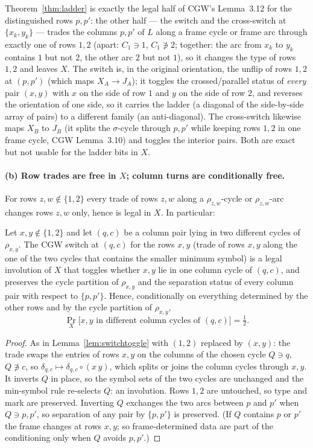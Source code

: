 Theorem~\ref{thm:ladder} is exactly the legal half of CGW's
Lemma~3.12 for the distinguished rows $p,p'$: the other half --- the
switch and the cross-switch at $\{x_k,y_k\}$ --- trades the columns
$p,p'$ of $L$ along a frame cycle or frame arc through exactly one of
rows $1,2$ (apart: $C_1\ni1$, $C_1\not\ni2$; together: the arc from
$x_k$ to $y_k$ contains $1$ but not $2$, the other arc $2$ but not
$1$), so it changes the type of rows $1,2$ and leaves $X$.  The switch
is, in the original orientation, the unflip of rows $1,2$ at $(p,p')$
(which maps $X_A\to J_A$); it toggles the crossed/parallel status of
\emph{every} pair $(x,y)$ with $x$ on the side of row $1$ and $y$ on
the side of row $2$, and reverses the orientation of one side, so it
carries the ladder (a diagonal of the side-by-side array of pairs) to
a different family (an anti-diagonal).  The cross-switch likewise maps
$X_B$ to $J_B$ (it splits the $\sigma$-cycle through $p,p'$ while
keeping rows $1,2$ in one frame cycle, CGW Lemma~3.10) and toggles
the interior pairs.  Both are exact but not usable for the ladder bits
in $X$.

\paragraph{(b) Row trades are free in $X$; column turns are
conditionally free.}  For rows $z,w\notin\{1,2\}$ every trade of rows
$z,w$ along a $\rho_{z,w}$-cycle or $\rho_{z,w}$-arc changes rows
$z,w$ only, hence is legal in $X$.  In particular:

\begin{lemma}
\label{lem:rowfair}
Let $x,y\notin\{1,2\}$ and let $(q,c)$ be a column pair lying in two
different cycles of $\rho_{x,y}$.  The CGW switch at $(q,c)$ for the
rows $x,y$ (trade of rows $x,y$ along the one of the two cycles that
contains the smaller minimum symbol) is a legal involution of $X$
that toggles whether $x,y$ lie in one column cycle of $(q,c)$, and
preserves the cycle partition of $\rho_{x,y}$ and the separation
status of every column pair with respect to $\{p,p'\}$.  Hence,
conditionally on everything determined by the other rows and by the
cycle partition of $\rho_{x,y}$,
\[
\Pr_X\bigl[x,y\text{ in different column cycles of }(q,c)\bigr]=\tfrac12 .
\]
\end{lemma}

\begin{proof}
As in Lemma~\ref{lem:switchtoggle} with $(1,2)$ replaced by $(x,y)$:
the trade swaps the entries of rows $x,y$ on the columns of the chosen
cycle $Q\ni q$, $Q\not\ni c$, so $\delta_{q,c}\mapsto\delta_{q,c}\circ(x\,y)$,
which splits or joins the column cycles through $x,y$.  It inverts $Q$
in place, so the symbol sets of the two cycles are unchanged and the
min-symbol rule re-selects $Q$: an involution.  Rows $1,2$ are
untouched, so type and mark are preserved.  Inverting $Q$ exchanges the
two arcs between $p$ and $p'$ when $Q\ni p,p'$, so separation of any
pair by $\{p,p'\}$ is preserved.  (If $Q$ contains $p$ or $p'$ the
frame changes at rows $x,y$; so frame-determined data are part of the
conditioning only when $Q$ avoids $p,p'$.)
\end{proof}

